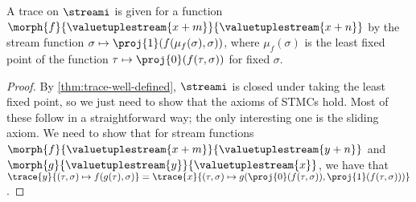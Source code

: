 \documentclass{lmcs}
\begin{document}
\begin{thm}
    A trace on \(\streami\) is given for a function \(
    \morph{f}{\valuetuplestream{x+m}}{\valuetuplestream{x+n}}
    \) by the stream function \(
    \sigma \mapsto \proj{1}(f(\mu_f(\sigma), \sigma))
    \), where \(\mu_f(\sigma)\) is the least fixed point of the function \(
    \tau \mapsto \proj{0}\mleft(f(\tau,\sigma)\mright)
    \) for fixed \(\sigma\).
\end{thm}
\begin{proof}
    By \autoref{thm:trace-well-defined}, \(\streami\) is closed under taking the
    least fixed point, so we just need to show that the axioms of STMCs hold.
    Most of these follow in a straightforward way; the only interesting one is
    the sliding axiom.
    We need to show that for stream functions \(
    \morph{f}{\valuetuplestream{x+m}}{\valuetuplestream{y+n}}
    \) and \(
    \morph{g}{\valuetuplestream{y}}{\valuetuplestream{x}}
    \), we have that \(
    \trace{y}{(\tau, \sigma) \mapsto f(g(\tau), \sigma)}
    =
    \trace{x}{
        (\tau, \sigma)
        \mapsto
        g(\proj{0}\mleft(f(\tau, \sigma)\mright),
        \proj{1}\mleft(f(\tau, \sigma)\mright))
    }
    \).


\end{proof}
\end{document}
